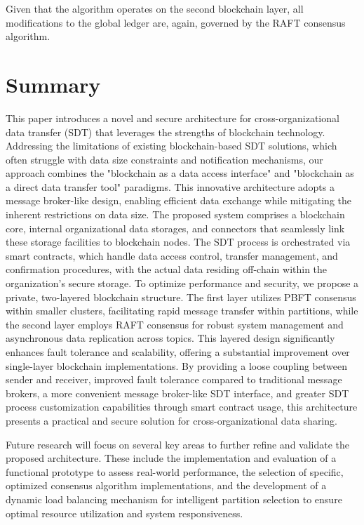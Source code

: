 \documentclass[10pt]{llncs}
\begin{document}
Given that the algorithm operates on the second blockchain layer, all modifications to the global ledger are, again, governed by the RAFT consensus algorithm.

\section{Summary} \label{summary}

This paper introduces a novel and secure architecture for cross-organizational data transfer (SDT) that leverages the strengths of blockchain technology. 
Addressing the limitations of existing blockchain-based SDT solutions, which often struggle with data size constraints and notification mechanisms, our approach combines the "blockchain as a data access interface" and "blockchain as a direct data transfer tool" paradigms. 
This innovative architecture adopts a message broker-like design, enabling efficient data exchange while mitigating the inherent restrictions on data size. 
The proposed system comprises a blockchain core, internal organizational data storages, and connectors that seamlessly link these storage facilities to blockchain nodes. 
The SDT process is orchestrated via smart contracts, which handle data access control, transfer management, and confirmation procedures, with the actual data residing off-chain within the organization's secure storage. 
To optimize performance and security, we propose a private, two-layered blockchain structure. 
The first layer utilizes PBFT consensus within smaller clusters, facilitating rapid message transfer within partitions, while the second layer employs RAFT consensus for robust system management and asynchronous data replication across topics.
This layered design significantly enhances fault tolerance and scalability, offering a substantial improvement over single-layer blockchain implementations. 
By providing a loose coupling between sender and receiver, improved fault tolerance compared to traditional message brokers, a more convenient message broker-like SDT interface, and greater SDT process customization capabilities through smart contract usage, 
this architecture presents a practical and secure solution for cross-organizational data sharing.

Future research will focus on several key areas to further refine and validate the proposed architecture. 
These include the implementation and evaluation of a functional prototype to assess real-world performance, the selection of specific, optimized consensus algorithm implementations, 
and the development of a dynamic load balancing mechanism for intelligent partition selection to ensure optimal resource utilization and system responsiveness.



\end{document}
